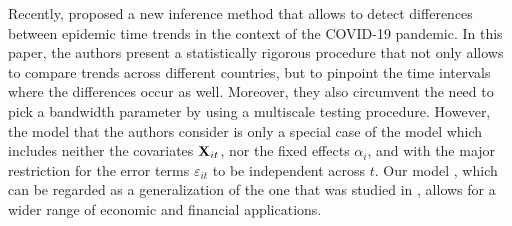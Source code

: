 \documentclass[a4paper,12pt]{article}
\makeatletter
\renewcommand{\eqref}[1]{\tagform@{\ref{#1}}}
\makeatother
\begin{document}
Recently, \cite{KhismatullinaVogt2021} proposed a new inference method that allows to detect differences between epidemic time trends in the context of the COVID-19 pandemic. In this paper, the authors present a statistically rigorous procedure that not only allows to compare trends across different countries, but to pinpoint the time intervals where the differences occur as well. Moreover, they also circumvent the need to pick a bandwidth parameter by using a multiscale testing procedure. However, the model that the authors consider is only a special case of the model \eqref{eq:model} which includes neither the covariates $\mathbf{X}_{it}$, nor the fixed effects $\alpha_i$, and with the major restriction for the error terms $\varepsilon_{it}$ to be independent across $t$. Our model \eqref{eq:model}, which can be regarded as a generalization of the one that was studied in \cite{KhismatullinaVogt2021}, allows for a wider range of economic and financial applications.


\end{document}
